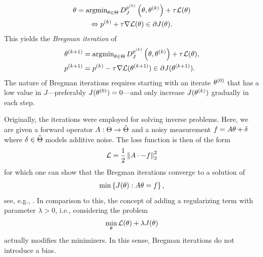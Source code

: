 %
\begin{gather}
\theta = \operatorname{argmin}_{\theta\in\Theta} D^{p^{(k)}}_J\left(\theta,\theta^{(k)}\right) + \tau^{}\mathcal{L}(\theta)
\\
\Leftrightarrow
p^{(k)} + \tau\nabla\mathcal{L}(\theta)\in \partial J(\theta). 
\end{gather}
%
This yields the \emph{Bregman iteration} of \cite{osher2005iterative}
%
%
\begin{subequations}\label{eq:bregman_iteration}
\begin{align}
\theta^{(k+1)} &= \operatorname{argmin}_{\theta\in\Theta} D^{p^{(k)}}_J\left(\theta,\theta^{(k)}\right) + \tau^{}\mathcal{L}(\theta), \\
p^{(k+1)} &= p^{(k)} - \tau^{}\nabla\mathcal{L}(\theta^{(k+1)}) \in \partial J(\theta^{(k+1)}).
\end{align}
\end{subequations}
%
The nature of Bregman iterations requires starting with an iterate $\theta^{(0)}$ that has a low value in $J$---preferably $J(\theta^{(0)}) = 0$---and only increase $J(\theta^{(k)})$ gradually in each step.
%
\begin{remark}{}{}
Originally, the iterations were employed for solving inverse problems. Here, we are given a forward operator $A:\Theta\to\tilde{\Theta}$ and a noisy measurement $f= A\theta +\delta$ where $\delta\in \tilde{\Theta}$ models additive noise. The loss function is then of the form
%
\begin{align*}
\mathcal{L} = \frac{1}{2}\left\|A\cdot - f\right\|^2_2
\end{align*}
%
for which one can show that the Bregman iterations converge to a solution of
%
\begin{align}\label{eq:Bregexact}
\min \left\{J(\theta): A\theta = f\right\},
\end{align}
%
see, e.g., \cite{osher2005iterative}. In comparison to this, the concept of adding a regularizing term with parameter $\lambda>0$, i.e., considering the problem
%
\begin{align*}
\min_\theta \mathcal{L}(\theta) + \lambda J(\theta) 
\end{align*}
%
actually modifies the minimizers. In this sense, Bregman iterations do not introduce a bias.
\end{remark}
%
%
